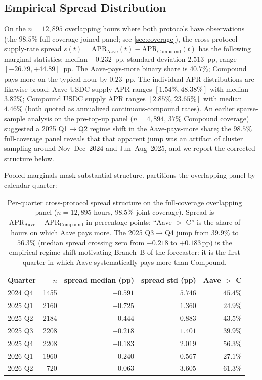 \subsection{Empirical Spread Distribution}
\label{sec:empirical-spread}

On the $n = 12{,}895$ overlapping hours where both protocols have
observations (the $98.5\%$ full-coverage joined panel; see
\cref{sec:coverage}), the cross-protocol supply-rate spread
$s(t) = \mathrm{APR}_{\text{Aave}}(t) - \mathrm{APR}_{\text{Compound}}(t)$
has the following marginal statistics: median
$-0.232$~pp, standard deviation $2.513$~pp, range
$[-26.79, +44.89]$~pp. The Aave-pays-more binary share is $40.7\%$;
Compound pays more on the typical hour by $0.23$~pp. The individual
APR distributions are likewise broad: Aave USDC supply APR ranges
$[1.54\%, 48.38\%]$ with median $3.82\%$; Compound USDC supply APR
ranges $[2.85\%, 23.65\%]$ with median $4.46\%$ (both quoted as
annualized continuous-compound rates). An earlier sparse-sample
analysis on the pre-top-up panel ($n = 4{,}894$, $37\%$ Compound
coverage) suggested a 2025 Q1$\to$Q2 regime shift in the
Aave-pays-more share; the $98.5\%$ full-coverage panel reveals that
that apparent jump was an artifact of cluster sampling around
Nov--Dec~2024 and Jun--Aug~2025, and we report the corrected
structure below.

Pooled marginals mask substantial structure. 
partitions the overlapping panel by calendar quarter:

\begin{table}[t]
\centering
\caption{Per-quarter cross-protocol spread structure on the full-coverage
overlapping panel ($n = 12{,}895$ hours, $98.5\%$ joint coverage).
Spread is $\text{APR}_{\text{Aave}} - \text{APR}_{\text{Compound}}$
in percentage points; ``Aave $>$ C'' is the share of hours on which
Aave pays more. The 2025 Q3$\to$Q4 jump from $39.9\%$ to $56.3\%$
(median spread crossing zero from $-0.218$ to $+0.183$\,pp) is the
empirical regime shift motivating Branch~B of the forecaster: it is
the first quarter in which Aave systematically pays more than Compound.}
\label{tab:regime-quarters}
\begin{tabular}{lrrrr}
\toprule
Quarter & $n$ & spread median (pp) & spread std (pp) & Aave $>$ C \\
\midrule
2024 Q4 & 1455 & $-0.591$ & $5.746$ & $45.4\%$ \\
2025 Q1 & 2160 & $-0.725$ & $1.360$ & $24.9\%$ \\
2025 Q2 & 2184 & $-0.444$ & $0.883$ & $43.5\%$ \\
2025 Q3 & 2208 & $-0.218$ & $1.401$ & $39.9\%$ \\
2025 Q4 & 2208 & $+0.183$ & $2.019$ & $56.3\%$ \\
2026 Q1 & 1960 & $-0.240$ & $0.567$ & $27.1\%$ \\
2026 Q2 &  720 & $+0.063$ & $3.605$ & $61.3\%$ \\
\bottomrule
\end{tabular}
\end{table}

